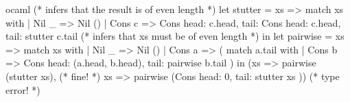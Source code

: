 \begin{cminted}{ocaml}
(* infers that the result is of even length *)
let stutter = xs => 
  match xs with
  | Nil _ => Nil ()
  | Cons c => Cons {
      head: c.head,
      tail: Cons { 
        head: c.head, tail: stutter c.tail 
      }
    } 
(* infers that xs must be of even length *)
in let pairwise = xs => 
  match xs with
  | Nil _ => Nil () 
  | Cons a => (
      match a.tail with 
      | Cons b => Cons { 
          head: (a.head, b.head), tail: pairwise b.tail 
        })
in (xs => pairwise (stutter xs), (* fine! *)
    xs => pairwise (Cons { head: 0, tail: stutter xs })) (* type error! *) 
\end{cminted}